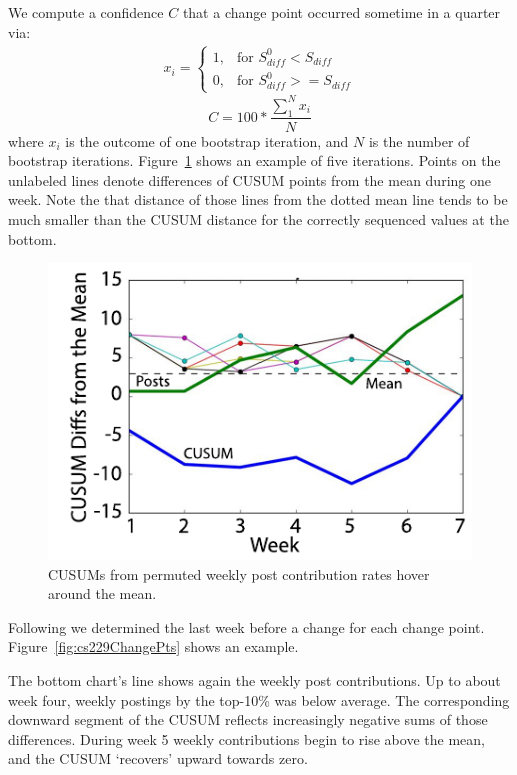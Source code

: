 We compute a confidence $C$ that a change point occurred sometime in a
quarter via:
\begin{equation}
  \begin{split}
    x_i = \left.
    \begin{cases}
      1, & \mbox{for } S_{diff}^0 < S_{diff} \\
      0, & \mbox{for }S_{diff}^0 >= S_{diff}
    \end{cases}
    \right.
  \end{split}
\end{equation}
\begin{equation}
  \label{eqn:confidence}
  C = \left.
  100*\frac{\sum_1^N x_i}{N}
  \right.
\end{equation}
where $x_i$ is the outcome of one bootstrap iteration, and $N$ is the
number of bootstrap iterations. Figure~\ref{fig:multiBoots} shows an
example of five iterations. Points on the unlabeled lines denote
differences of CUSUM points from the mean during one week. Note the
that distance of those lines from the dotted mean line tends to be
much smaller than the CUSUM distance for the correctly sequenced
values at the bottom.
\begin{figure}[]
       \centering
       \includegraphics{Figs/multiBootstrapCurvesUrbStud145Summer14.pdf}
       \caption{\textnormal{CUSUMs from permuted weekly post
           contribution rates hover around the mean.}}
       \label{fig:multiBoots}
\end{figure}
Following \cite{tayl16} we determined the last week before a change
for each change point. Figure~\ref{fig:cs229ChangePts} shows an
example.

The bottom chart's line shows again the weekly post contributions.
Up to about week four, weekly postings by the top-10\% was below
average. The corresponding downward segment of the CUSUM reflects
increasingly negative sums of those differences. During week 5 weekly
contributions begin to rise above the mean, and the CUSUM `recovers'
upward towards zero.

